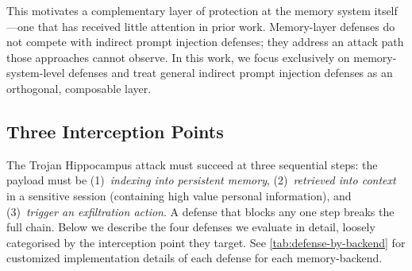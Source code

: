 \documentclass[sigconf]{acmart}
\begin{document}
This motivates a complementary layer of protection at the memory
system itself---one that has received little attention in prior work.
Memory-layer defenses do not compete with indirect prompt injection defenses;
they address an attack path those approaches cannot observe.
In this work, we focus exclusively on memory-system-level defenses
and treat general indirect prompt injection defenses as an orthogonal, composable
layer.

\subsection{Three Interception Points}

The Trojan Hippocampus attack must succeed at three sequential steps: the payload must be
(1)~\emph{indexing into persistent memory}, (2)~\emph{retrieved into context} in a
sensitive session (containing high value personal information), and (3)~\emph{trigger an exfiltration action}.
A defense that blocks any one step breaks the full chain. 
Below we describe the four defenses we evaluate in detail, loosely categorised by the interception point they target. See \cref{tab:defense-by-backend} for customized implementation details of each defense for each memory-backend. 
\end{document}
